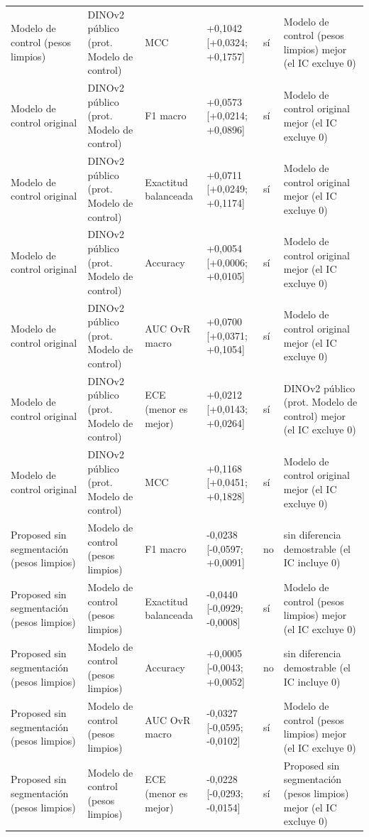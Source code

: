 \begin{longtable}{@{}llllll@{}}
Modelo de control (pesos limpios) & DINOv2 público (prot. Modelo de control) & MCC & +0,1042 [+0,0324; +0,1757] & sí & Modelo de control (pesos limpios) mejor (el IC excluye 0) \\
Modelo de control original & DINOv2 público (prot. Modelo de control) & F1 macro & +0,0573 [+0,0214; +0,0896] & sí & Modelo de control original mejor (el IC excluye 0) \\
Modelo de control original & DINOv2 público (prot. Modelo de control) & Exactitud balanceada & +0,0711 [+0,0249; +0,1174] & sí & Modelo de control original mejor (el IC excluye 0) \\
Modelo de control original & DINOv2 público (prot. Modelo de control) & Accuracy & +0,0054 [+0,0006; +0,0105] & sí & Modelo de control original mejor (el IC excluye 0) \\
Modelo de control original & DINOv2 público (prot. Modelo de control) & AUC OvR macro & +0,0700 [+0,0371; +0,1054] & sí & Modelo de control original mejor (el IC excluye 0) \\
Modelo de control original & DINOv2 público (prot. Modelo de control) & ECE (menor es mejor) & +0,0212 [+0,0143; +0,0264] & sí & DINOv2 público (prot. Modelo de control) mejor (el IC excluye 0) \\
Modelo de control original & DINOv2 público (prot. Modelo de control) & MCC & +0,1168 [+0,0451; +0,1828] & sí & Modelo de control original mejor (el IC excluye 0) \\
Proposed sin segmentación (pesos limpios) & Modelo de control (pesos limpios) & F1 macro & -0,0238 [-0,0597; +0,0091] & no & sin diferencia demostrable (el IC incluye 0) \\
Proposed sin segmentación (pesos limpios) & Modelo de control (pesos limpios) & Exactitud balanceada & -0,0440 [-0,0929; -0,0008] & sí & Modelo de control (pesos limpios) mejor (el IC excluye 0) \\
Proposed sin segmentación (pesos limpios) & Modelo de control (pesos limpios) & Accuracy & +0,0005 [-0,0043; +0,0052] & no & sin diferencia demostrable (el IC incluye 0) \\
Proposed sin segmentación (pesos limpios) & Modelo de control (pesos limpios) & AUC OvR macro & -0,0327 [-0,0595; -0,0102] & sí & Modelo de control (pesos limpios) mejor (el IC excluye 0) \\
Proposed sin segmentación (pesos limpios) & Modelo de control (pesos limpios) & ECE (menor es mejor) & -0,0228 [-0,0293; -0,0154] & sí & Proposed sin segmentación (pesos limpios) mejor (el IC excluye 0) \\

\end{longtable}

